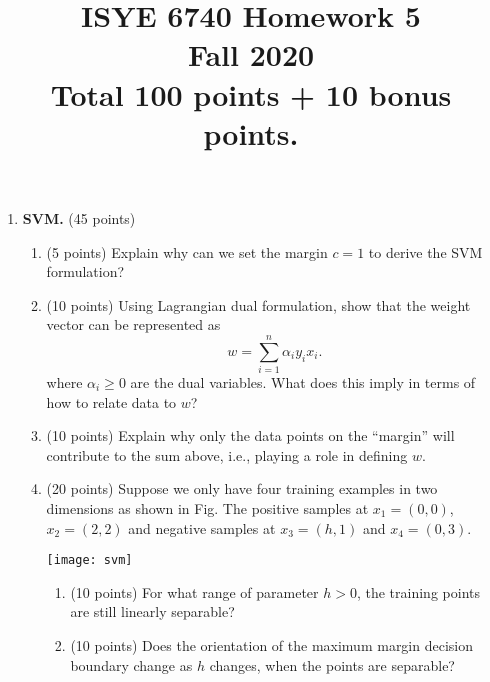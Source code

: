 \documentclass[twoside,10pt]{article}
\begin{document}
\title{ISYE 6740 Homework 5\\ 
Fall 2020\\
\small Total 100 points + 10 bonus points.}
\date{}
\maketitle







\begin{enumerate}


\item{\bf SVM. } (45 points)

\begin{enumerate}
\item (5 points) Explain why can we set the margin $c = 1$ to derive the SVM formulation?
\item (10 points) Using Lagrangian dual formulation, show that the weight vector can be represented as
\[
w = \sum_{i=1}^n \alpha_i y_i x_i.
\]
where $\alpha_i \geq 0$ are the dual variables. What does this imply in terms of how to relate data to $w$?
\item (10 points) Explain why only the data points on the ``margin'' will contribute to the sum above, i.e., playing a role in defining $w$. 

\item (20 points) Suppose we only have four training examples in two dimensions as shown in Fig. The positive samples at $x_1 = (0, 0)$, $x_2 = (2, 2)$ and negative samples at $x_3 = (h, 1)$ and $x_4 = (0, 3)$. 
%
\begin{center}
\texttt{[image: svm]}
\end{center}

\begin{enumerate}
\item (10 points) For what range of parameter $h > 0$, the training points are still linearly separable?



\item (10 points) Does the orientation of the maximum margin decision boundary change as $h$ changes, when the points are separable?
\end{enumerate}
\end{enumerate}




\end{enumerate}
\end{document}
